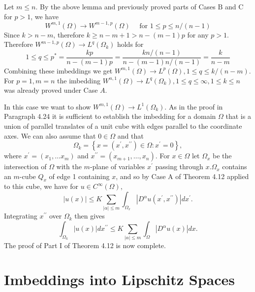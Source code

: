 \begin{para}[Proof of Part I, Cases B and C of Theorem 4.12 for $\bm{p=1}$, $\bm{k>n-m}$]
  Let $m \leq n$. By the above lemma and previously proved parts of Cases $\mathrm{B}$ and $\mathrm{C}$ for $p>1$, we have
  \[
  W^{m, 1}(\Omega) \rightarrow W^{m-1, p}(\Omega) \quad \text { for } 1 \leq p \leq n /(n-1)
  \]
  Since $k>n-m$, therefore $k \geq n-m+1>n-(m-1) p$ for any $p>1$. Therefore $W^{m-1, p}(\Omega) \rightarrow L^q\left(\Omega_k\right)$ holds for
  \[
  1 \leq q \leq p^*=\frac{k p}{n-(m-1) p}=\frac{k n /(n-1)}{n-(m-1) n /(n-1)}=\frac{k}{n-m}
  \]
  Combining these imbeddings we get $W^{m, 1}(\Omega) \rightarrow L^p(\Omega), 1 \leq q \leq k /(n-m)$.
  For $p=1, m=n$ the imbedding $W^{n, 1}(\Omega) \rightarrow L^q\left(\Omega_k\right), 1 \leq q \leq \infty, 1 \leq k \leq n$ was already proved under Case $A$.
\end{para}


\begin{para}[Proof of Part I, Case C of Theorem 4.12 for $\bm{p=1}$, $\bm{k=n-m}$]
  In this case we want to show $W^{m, 1}(\Omega) \rightarrow L^1\left(\Omega_k\right)$.
  As in the proof in Paragraph 4.24 it is sufficient to establish the imbedding for a domain 
  $\Omega$ that is a union of parallel translates of a unit cube with edges parallel to the 
  coordinate axes. We can also assume that $0 \in \Omega$ and that
  \[
  \Omega_k=\left\{x=\left(x^{\prime}, x^{\prime \prime}\right) \in \Omega: x^{\prime}=0\right\},
  \]
  where $x^{\prime}=\left(x_1, \ldots x_m\right)$ and $x^{\prime \prime}=\left(x_{m+1}, \ldots, x_n\right)$. For $x \in \Omega$ let $\Omega_x$ be the intersection of $\Omega$ with the $m$-plane of variables $x^{\prime}$ passing through $x . \Omega_x$ contains an $m$-cube $Q_x$ of edge 1 containing $x$, and so by Case A of Theorem 4.12 applied to this cube, we have for $u \in C^{\infty}(\Omega)$,
  \[
  |u(x)| \leq K \sum_{|\alpha| \leq m} \int_{\Omega_x}\left|D^\alpha u\left(x^{\prime}, x^{\prime \prime}\right)\right| d x^{\prime} .
  \]
  Integrating $x^{\prime \prime}$ over $\Omega_k$ then gives
  \[
  \int_{\Omega_k}|u(x)| d x^{\prime \prime} \leq K \sum_{|\alpha| \leq m} \int_{\Omega}\left|D^\alpha u(x)\right| d x .
  \]
  The proof of Part I of Theorem 4.12 is now complete.
\end{para}


\section{Imbeddings into Lipschitz Spaces}


